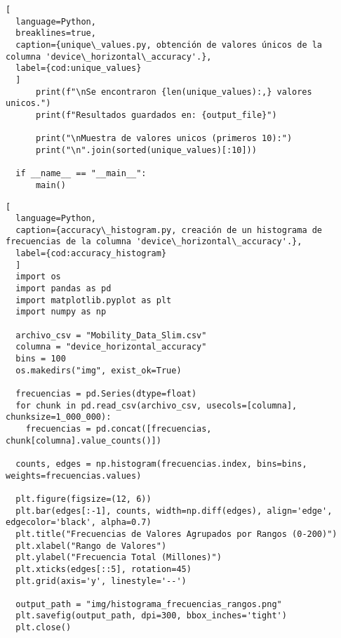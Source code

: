 \begin{lstlisting}[
  language=Python,
  breaklines=true,
  caption={unique\_values.py, obtención de valores únicos de la columna 'device\_horizontal\_accuracy'.},
  label={cod:unique_values}
  ]
      print(f"\nSe encontraron {len(unique_values):,} valores unicos.")
      print(f"Resultados guardados en: {output_file}")

      print("\nMuestra de valores unicos (primeros 10):")
      print("\n".join(sorted(unique_values)[:10]))

  if __name__ == "__main__":
      main()
\end{lstlisting}
\vfill

\begin{lstlisting}[
  language=Python,
  caption={accuracy\_histogram.py, creación de un histograma de frecuencias de la columna 'device\_horizontal\_accuracy'.},
  label={cod:accuracy_histogram}
  ]
  import os
  import pandas as pd
  import matplotlib.pyplot as plt
  import numpy as np

  archivo_csv = "Mobility_Data_Slim.csv"
  columna = "device_horizontal_accuracy"  
  bins = 100 
  os.makedirs("img", exist_ok=True) 

  frecuencias = pd.Series(dtype=float)
  for chunk in pd.read_csv(archivo_csv, usecols=[columna], chunksize=1_000_000):
    frecuencias = pd.concat([frecuencias, chunk[columna].value_counts()])

  counts, edges = np.histogram(frecuencias.index, bins=bins, weights=frecuencias.values)

  plt.figure(figsize=(12, 6))
  plt.bar(edges[:-1], counts, width=np.diff(edges), align='edge', edgecolor='black', alpha=0.7)
  plt.title("Frecuencias de Valores Agrupados por Rangos (0-200)")
  plt.xlabel("Rango de Valores")
  plt.ylabel("Frecuencia Total (Millones)")
  plt.xticks(edges[::5], rotation=45) 
  plt.grid(axis='y', linestyle='--')

  output_path = "img/histograma_frecuencias_rangos.png"
  plt.savefig(output_path, dpi=300, bbox_inches='tight')
  plt.close()
\end{lstlisting}
\vfill

